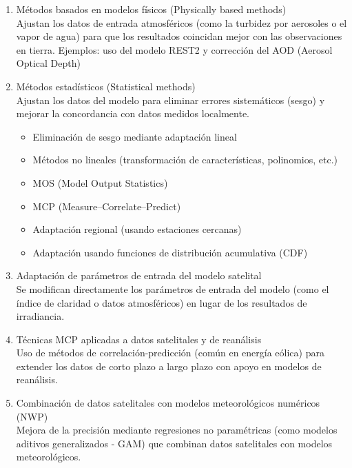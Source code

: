 \begin{enumerate}
    \item Métodos basados en modelos físicos (Physically based methods)\\
        Ajustan los datos de entrada atmosféricos (como la turbidez por aerosoles o el vapor de agua) para que los resultados coincidan mejor con las observaciones en tierra. Ejemplos: uso del modelo REST2 y corrección del AOD (Aerosol Optical Depth)
    \item Métodos estadísticos (Statistical methods) \\
        Ajustan los datos del modelo para eliminar errores sistemáticos (sesgo) y mejorar la concordancia con datos medidos localmente.

        \begin{itemize}
            \item Eliminación de sesgo mediante adaptación lineal
            \item Métodos no lineales (transformación de características, polinomios, etc.)
            \item MOS (Model Output Statistics)
            \item MCP (Measure–Correlate–Predict)
            \item Adaptación regional (usando estaciones cercanas)
            \item Adaptación usando funciones de distribución acumulativa (CDF)
        \end{itemize}
        
    \item Adaptación de parámetros de entrada del modelo satelital \\
        Se modifican directamente los parámetros de entrada del modelo (como el índice de claridad o datos atmosféricos) en lugar de los resultados de irradiancia.
    \item Técnicas MCP aplicadas a datos satelitales y de reanálisis \\
        Uso de métodos de correlación-predicción (común en energía eólica) para extender los datos de corto plazo a largo plazo con apoyo en modelos de reanálisis.
        
    \item Combinación de datos satelitales con modelos meteorológicos numéricos (NWP)\\
        Mejora de la precisión mediante regresiones no paramétricas (como modelos aditivos generalizados - GAM) que combinan datos satelitales con modelos meteorológicos.
\end{enumerate}


